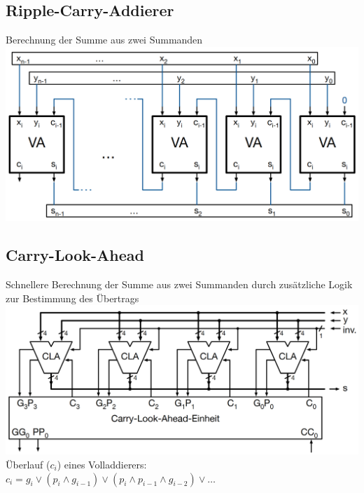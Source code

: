 \documentclass[ngerman, threecolumn, 8pt]{latex4ei/latex4ei_sheet}
\begin{document}
\subsection{Ripple-Carry-Addierer}
Berechnung der Summe aus zwei Summanden \\
\includegraphics[width=.9\linewidth]{img/rca/rca.png} \\
\subsection{Carry-Look-Ahead}
Schnellere Berechnung der Summe aus zwei Summanden durch zusätzliche Logik zur Bestimmung des Übertrags\\
\includegraphics[width=.95\linewidth]{img/rca/cla.png} \\
Überlauf ($c_i$) eines Volladdierers:\\
$c_i=g_i \lor (p_i \land g_{i-1}) \lor (p_i \land p_{i-1} \land g_{i-2}) \lor \dots$\\
\end{document}
